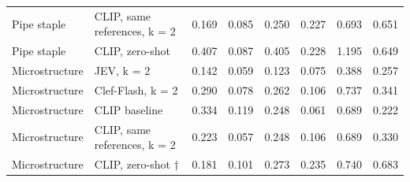 \begin{table}
\begin{tabular}[t]{llrrrrrr}
Pipe staple & CLIP, same references, k = 2 & 0.169 & 0.085 & 0.250 & 0.227 & 0.693 & 0.651\\
Pipe staple & CLIP, zero-shot & 0.407 & 0.087 & 0.405 & 0.228 & 1.195 & 0.649\\
\addlinespace
Microstructure & JEV, k = 2 & 0.142 & 0.059 & 0.123 & 0.075 & 0.388 & 0.257\\
Microstructure & Clef-Flash, k = 2 & 0.290 & 0.078 & 0.262 & 0.106 & 0.737 & 0.341\\
Microstructure & CLIP baseline & 0.334 & 0.119 & 0.248 & 0.061 & 0.689 & 0.222\\
Microstructure & CLIP, same references, k = 2 & 0.223 & 0.057 & 0.248 & 0.106 & 0.689 & 0.330\\
Microstructure & CLIP, zero-shot † & 0.181 & 0.101 & 0.273 & 0.235 & 0.740 & 0.683\\
\bottomrule
\end{tabular}
\end{table}
